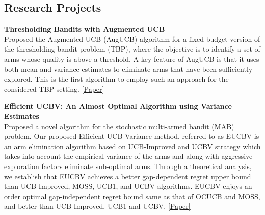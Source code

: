 \documentclass[margin,11pt]{res}
\begin{document}
\begin{resume}
\section{Research Projects}
\par 

\textbf{Thresholding Bandits with Augmented UCB}\\
Proposed the Augmented-UCB (AugUCB) algorithm for a fixed-budget version of the thresholding bandit problem (TBP), where the objective is to identify a set of arms whose quality is above a threshold. A key feature of AugUCB is that it uses both mean and variance estimates to eliminate arms that have been sufficiently explored. This is the first algorithm to employ such an approach for the considered TBP setting. \href{https://www.ijcai.org/proceedings/2017/0350.pdf}{[Paper]}
\par

\textbf{Efficient UCBV: An Almost Optimal Algorithm using Variance Estimates}\\
Proposed a novel algorithm for the stochastic multi-armed bandit (MAB) problem. Our proposed Efficient UCB Variance method, referred to as EUCBV is an arm elimination algorithm based on UCB-Improved and UCBV strategy which takes into account the empirical variance of the arms and along with aggressive exploration factors eliminate sub-optimal arms. Through a theoretical analysis, we establish that EUCBV achieves a better gap-dependent regret upper bound than UCB-Improved, MOSS, UCB1, and UCBV algorithms. EUCBV enjoys an order optimal gap-independent regret bound same as that of OCUCB and MOSS, and better than UCB-Improved, UCB1 and UCBV. \href{https://www.aaai.org/ocs/index.php/AAAI/AAAI18/paper/view/16111}{[Paper]}
\par


\end{resume}
\end{document}
